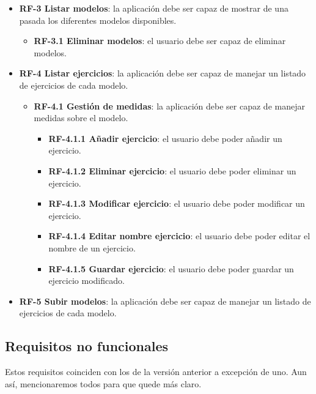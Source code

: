 \begin{itemize}
	\item \textbf{RF-3 Listar modelos}: la aplicación debe ser capaz de mostrar de una pasada los diferentes modelos disponibles.
	\begin{itemize}
		\item \textbf{RF-3.1 Eliminar modelos}: el usuario debe ser capaz de eliminar modelos.
	\end{itemize}
	\item \textbf{RF-4 Listar ejercicios}: la aplicación debe ser capaz de manejar un listado de ejercicios de cada modelo.
	\begin{itemize}
		\item \textbf{RF-4.1 Gestión de medidas}: la aplicación debe ser capaz de manejar medidas sobre el modelo.
		\begin{itemize}
			\item \textbf{RF-4.1.1 Añadir ejercicio}: el usuario debe poder añadir un ejercicio.
			\item \textbf{RF-4.1.2 Eliminar ejercicio}: el usuario debe poder eliminar un ejercicio.
			\item \textbf{RF-4.1.3 Modificar ejercicio}: el usuario debe poder modificar un ejercicio.
			\item \textbf{RF-4.1.4 Editar nombre ejercicio}: el usuario debe poder editar el nombre de un ejercicio.
			\item \textbf{RF-4.1.5 Guardar ejercicio}: el usuario debe poder guardar un ejercicio modificado.
		\end{itemize}
	\end{itemize}
	\item \textbf{RF-5 Subir modelos}: la aplicación debe ser capaz de manejar un listado de ejercicios de cada modelo.
\end{itemize}

\subsection{Requisitos no funcionales}
Estos requisitos coinciden con los de la versión anterior a excepción de uno. Aun así, mencionaremos todos para que quede más claro.

